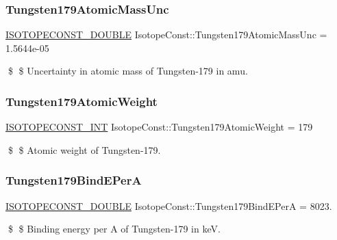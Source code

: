 \subsubsection{\texorpdfstring{Tungsten179\+Atomic\+Mass\+Unc}{Tungsten179AtomicMassUnc}}
{\footnotesize\ttfamily \mbox{\hyperlink{group___isotope_const-_macros_ga8f45a7272ce02c0b4c65c44636ed719a}{I\+S\+O\+T\+O\+P\+E\+C\+O\+N\+S\+T\+\_\+\+D\+O\+U\+B\+LE}} Isotope\+Const\+::\+Tungsten179\+Atomic\+Mass\+Unc = 1.\+5644e-\/05}

\$ \$ Uncertainty in atomic mass of Tungsten-\/179 in amu. \mbox{\label{group___isotope_const-_tungsten-_w179_ga93d4de06e56b0b51d83f3a36d3d5725c}} 
\subsubsection{\texorpdfstring{Tungsten179\+Atomic\+Weight}{Tungsten179AtomicWeight}}
{\footnotesize\ttfamily \mbox{\hyperlink{group___isotope_const-_macros_ga5f18360b3e99483a35c32d789e62621c}{I\+S\+O\+T\+O\+P\+E\+C\+O\+N\+S\+T\+\_\+\+I\+NT}} Isotope\+Const\+::\+Tungsten179\+Atomic\+Weight = 179}

\$ \$ Atomic weight of Tungsten-\/179. \mbox{\label{group___isotope_const-_tungsten-_w179_gaa0e7cdd727678510538f7afa6678854c}} 
\subsubsection{\texorpdfstring{Tungsten179\+Bind\+E\+PerA}{Tungsten179BindEPerA}}
{\footnotesize\ttfamily \mbox{\hyperlink{group___isotope_const-_macros_ga8f45a7272ce02c0b4c65c44636ed719a}{I\+S\+O\+T\+O\+P\+E\+C\+O\+N\+S\+T\+\_\+\+D\+O\+U\+B\+LE}} Isotope\+Const\+::\+Tungsten179\+Bind\+E\+PerA = 8023.}

\$ \$ Binding energy per A of Tungsten-\/179 in keV. \mbox{\label{group___isotope_const-_tungsten-_w179_ga4862d53bd745a35cf71ab4cdd9670e61}} 
